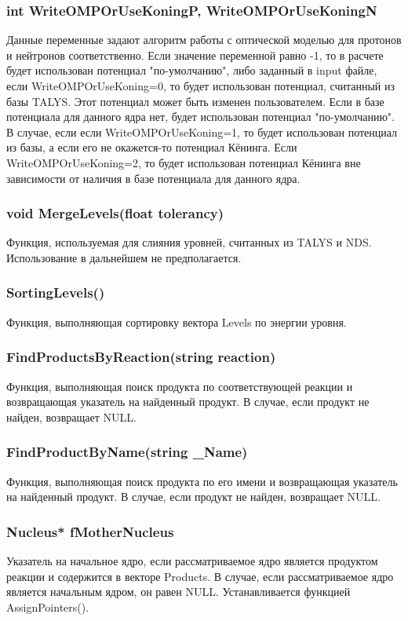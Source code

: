 \documentclass[a4paper,12pt]{extarticle}
\begin{document}
\subsubsection{int WriteOMPOrUseKoningP, WriteOMPOrUseKoningN}
Данные переменные задают алгоритм работы с оптической моделью для протонов и нейтронов соответственно. Если значение переменной равно -1, то в расчете будет использован потенциал "по-умолчанию", либо заданный в input файле, если WriteOMPOrUseKoning=0, то будет использован потенциал, считанный из базы TALYS. Этот потенциал может быть изменен пользователем. Если в базе потенциала для данного ядра нет, будет использован потенциал "по-умолчанию". В случае, если если WriteOMPOrUseKoning=1, то будет использован потенциал из базы, а если его не окажется-то потенциал Кёнинга. Если WriteOMPOrUseKoning=2, то будет использован потенциал Кёнинга вне зависимости от наличия в базе потенциала для данного ядра.
\subsubsection{void MergeLevels(float tolerancy)}
Функция, используемая для слияния уровней, считанных из TALYS и NDS. Использование в дальнейшем не предполагается.
\subsubsection{SortingLevels()}
Функция, выполняющая сортировку вектора Levels по энергии уровня. 
\subsubsection{FindProductsByReaction(string reaction)}
Функция, выполняющая поиск продукта по соответствующей реакции и возвращающая указатель на найденный продукт. В случае, если продукт не найден, возвращает NULL.
\subsubsection{FindProductByName(string _Name)}
Функция, выполняющая поиск продукта по его имени и возвращающая указатель на найденный продукт. В случае, если продукт не найден, возвращает NULL.
\subsubsection{Nucleus* fMotherNucleus}
Указатель на начальное ядро, если рассматриваемое ядро является продуктом реакции и содержится в векторе Products. В случае, если рассматриваемое ядро является начальным ядром, он равен NULL. Устанавливается функцией AssignPointers().
\end{document}
